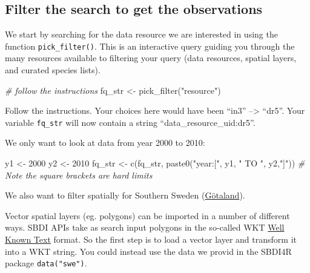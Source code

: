 \documentclass[
  10pt,
]{article}
\newenvironment{Shaded}{\begin{snugshade}}{\end{snugshade}}
\newcommand{\CommentTok}[1]{\textcolor[rgb]{0.56,0.35,0.01}{\textit{#1}}}
\newcommand{\DecValTok}[1]{\textcolor[rgb]{0.00,0.00,0.81}{#1}}
\newcommand{\FunctionTok}[1]{\textcolor[rgb]{0.00,0.00,0.00}{#1}}
\newcommand{\NormalTok}[1]{#1}
\newcommand{\OtherTok}[1]{\textcolor[rgb]{0.56,0.35,0.01}{#1}}
\newcommand{\StringTok}[1]{\textcolor[rgb]{0.31,0.60,0.02}{#1}}
\begin{document}
\hypertarget{filter-the-search-to-get-the-observations}{%
\subsection{Filter the search to get the observations}\label{filter-the-search-to-get-the-observations}}

We start by searching for the data resource we are interested in using
the function \texttt{pick\_filter()}. This is an interactive query guiding you through
the many resources available to filtering your query (data resources, spatial
layers, and curated species lists).

\begin{Shaded}
\begin{Highlighting}[]
\CommentTok{\# follow the instructions }
\NormalTok{fq\_str }\OtherTok{\textless{}{-}} \FunctionTok{pick\_filter}\NormalTok{(}\StringTok{"resource"}\NormalTok{) }
\end{Highlighting}
\end{Shaded}

Follow the instructions. Your choices here would have been ``in3'' --\textgreater{} ``dr5''.
Your variable \texttt{fq\_str} will now contain a string ``data\_resource\_uid:dr5''.

We only want to look at data from year 2000 to 2010:

\begin{Shaded}
\begin{Highlighting}[]
\NormalTok{y1 }\OtherTok{\textless{}{-}} \DecValTok{2000}
\NormalTok{y2 }\OtherTok{\textless{}{-}} \DecValTok{2010}
\NormalTok{fq\_str }\OtherTok{\textless{}{-}} \FunctionTok{c}\NormalTok{(fq\_str, }\FunctionTok{paste0}\NormalTok{(}\StringTok{"year:["}\NormalTok{, y1, }\StringTok{" TO "}\NormalTok{, y2,}\StringTok{"]"}\NormalTok{))}
\CommentTok{\# Note the square brackets are hard limits}
\end{Highlighting}
\end{Shaded}

We also want to filter spatially for Southern Sweden (\href{https://en.wikipedia.org/wiki/G\%C3\%B6taland}{Götaland}).

Vector spatial layers (eg. polygons) can be imported in a number of different ways.
SBDI APIs take as search input polygons in the so-called WKT \href{https://www.geoapi.org/3.0/javadoc/org/opengis/referencing/doc-files/WKT.html}{Well Known Text}
format. So the first step is to load a vector layer and transform it into a WKT string.
You could instead use the data we provid in the SBDI4R package \texttt{data("swe")}.
\end{document}
